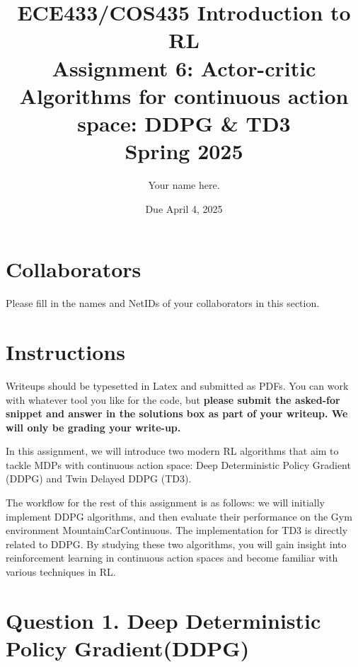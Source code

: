 \documentclass[12pt]{article}
\date{Due April 4, 2025}
\author{\begin{fillme}[width=0.3\textwidth]
 Your name here.
\end{fillme}} %
\title{ECE433/COS435 Introduction to RL\\
  Assignment 6: Actor-critic Algorithms for continuous action space: DDPG \& TD3
\\
  Spring 2025\\
}
\begin{document}
  \maketitle
  \section*{Collaborators}
\begin{fillme}
 Please fill in the names and NetIDs of your collaborators in this section.
\end{fillme}

\section*{Instructions}

Writeups should be typesetted in Latex and submitted as PDFs. You can work with whatever tool you like for the code, but \textbf{please submit the asked-for snippet and answer in the solutions box as part of your writeup. We will only be grading your write-up.}


In this assignment, we will introduce two modern RL algorithms that aim to tackle MDPs with continuous action space: Deep Deterministic Policy Gradient (DDPG) and Twin Delayed DDPG (TD3).

The workflow for the rest of this assignment is as follows: we will initially implement DDPG algorithms, and then evaluate their performance on the Gym environment MountainCarContinuous. The implementation for TD3 is directly related to DDPG. By studying these two algorithms, you will gain insight into reinforcement learning in continuous action spaces and become familiar with various techniques in RL.

\section*{Question 1. Deep Deterministic Policy Gradient(DDPG)}
\end{document}
